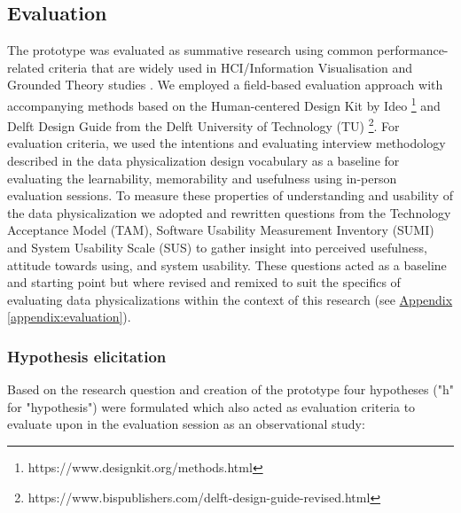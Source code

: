 \subsection{Evaluation}
\label{sec:evaluation}

The prototype was evaluated as summative research using common performance-related criteria that are widely used in HCI/Information Visualisation \cite{ranasinghe_encoding_2023} and Grounded Theory studies \cite{chun_tie_grounded_2019}. We employed a field-based evaluation approach with accompanying methods based on the Human-centered Design Kit by Ideo \footnote{https://www.designkit.org/methods.html} and Delft Design Guide from the Delft University of Technology (TU) \footnote{https://www.bispublishers.com/delft-design-guide-revised.html}. For evaluation criteria, we used the intentions and evaluating interview methodology described in the data physicalization design vocabulary \cite{jansen_evaluating_2013,ranasinghe_encoding_2023} as a baseline for evaluating the learnability, memorability and usefulness using in-person evaluation sessions. To measure these properties of understanding and usability of the data physicalization we adopted and rewritten questions from the Technology Acceptance Model (TAM), Software Usability Measurement Inventory (SUMI) and System Usability Scale (SUS) to gather insight into perceived usefulness, attitude towards using, and system usability\cite{davis_perceived_1989, brooke_sus_1996}. These questions acted as a baseline and starting point but where revised and remixed to suit the specifics of evaluating data physicalizations within the context of this research (see \hyperref[appendix:evaluation]{Appendix \ref*{appendix:evaluation}}).

\subsubsection{Hypothesis elicitation}

Based on the research question and creation of the prototype four hypotheses ("h" for "hypothesis") were formulated which also acted as evaluation criteria to evaluate upon in the evaluation session as an observational study:

